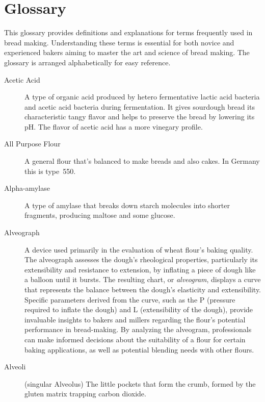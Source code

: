 \chapter{Glossary}%
\label{ch:Glossary}

\begin{quoting}
This glossary provides definitions and explanations for terms frequently
used in bread making. Understanding these terms is essential for both
novice and experienced bakers aiming to master the art and science of
bread making. The glossary is arranged alphabetically for easy reference.
\end{quoting}

\begin{description}

\item[Acetic Acid] A type of organic acid produced by hetero fermentative lactic
acid bacteria and acetic acid bacteria during fermentation. It gives sourdough bread
its characteristic tangy flavor and helps to preserve the bread by lowering its pH.
The flavor of acetic acid has a more vinegary profile.

\item[All Purpose Flour] A general flour that’s balanced to make breads and also
cakes. In Germany this is type~550.

\item[Alpha-amylase] A type of amylase that breaks down starch molecules into
shorter fragments, producing maltose and some glucose.

\item[Alveograph] A device used primarily in the evaluation of wheat flour's
baking quality. The alveograph assesses the dough's rheological properties,
particularly its extensibility and resistance to extension, by inflating a piece
of dough like a balloon until it bursts. The resulting chart, or \emph{alveogram},
displays a curve that represents the balance between the dough's elasticity and
extensibility. Specific parameters derived from the curve, such as the P (pressure
required to inflate the dough) and L (extensibility of the dough), provide invaluable
insights to bakers and millers regarding the flour's potential performance in
bread-making. By analyzing the alveogram, professionals can make informed decisions
about the suitability of a flour for certain baking applications, as well as
potential blending needs with other flours.

\item[Alveoli] (singular Alveolus) The little pockets that form the crumb,
formed by the gluten matrix trapping carbon dioxide.


\end{description}
